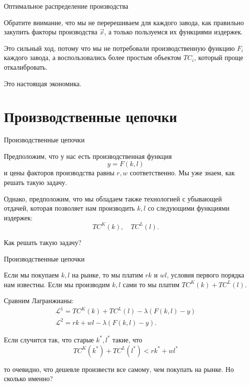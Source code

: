 \documentclass{beamer}
\begin{document}
\begin{frame}{Оптимальное распределение производства}

Обратите внимание, что мы не перерешиваем для каждого завода, как правильно закупить факторы производства $\vec x$, а только пользуемся их функциями издержек. 

Это сильный ход, потому что мы не потребовали производственную функцию $F_i$ каждого завода, а воспользовались более простым объектом $TC_i$, который проще откалибровать.

Это настоящая экономика.

\end{frame}

\section{Производственные цепочки}

\begin{frame}{Производственные цепочки}

Предположим, что у нас есть производственная функция
$$ y = F(k, l)$$
и цены факторов производства равны $r, w$ соответственно. Мы уже знаем, как решать такую задачу. 

Однако, предположим, что мы обладаем также технологией с убывающей отдачей, которая позволяет нам производить $k,l$ со следующими функциями издержек: $$ TC^K(k), \quad TC^L(l).$$ 

Как решать такую задачу?

\end{frame}

\begin{frame}{Производственные цепочки}

Если мы покупаем $k,l$ на рынке, то мы платим $rk$ и $wl$, условия первого порядка нам известны. Если мы производим $k,l$ сами то мы платим $TC^K(k) + TC^L(l)$. 

Сравним Лагранжианы:
\begin{gather*} 
\mathcal{L}^1 = TC^K(k) + TC^L(l) - \lambda (F(k,l) - y)\\
\mathcal{L}^2 = rk + wl - \lambda (F(k,l) - y).
\end{gather*}


Если случится так, что старые $k^{\ast}, l^{\ast}$ такие, что $$ TC^K(k^{\ast}) + TC^L(l^{\ast}) < rk^{\ast} + wl^{\ast}$$

то очевидно, что дешевле произвести все самому, чем покупать на рынке. Но сколько именно?

\end{frame}
\end{document}
